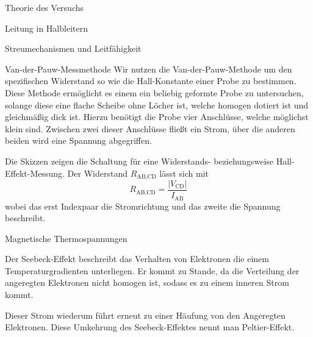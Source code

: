 \documentclass[pdftex, a4paper,11pt, twoside, ngerman]{report}
\newcommand\abs[1]{\left| #1 \right|}
\begin{document}
\begin{chapter}{Theorie des Versuchs}
\begin{section}{Leitung in Halbleitern}
\begin{subsection}{Streumechanismen und Leitfähigkeit}

         \end{subsection}

        \begin{subsection}{Van-der-Pauw-Messmethode}
            Wir nutzen die Van-der-Pauw-Methode um den spezifischen Widerstand so wie die Hall-Konstante einer Probe zu bestimmen.
            Diese Methode ermöglicht es einem ein beliebig geformte Probe zu untersuchen, solange diese eine flache Scheibe ohne Löcher ist, welche homogen dotiert ist und gleichmäßig dick ist.
            Hierzu benötigt die Probe vier Anschlüsse, welche möglichst klein sind. 
            Zwischen zwei dieser Anschlüsse fließt ein Strom, über die anderen beiden wird eine Spannung abgegriffen.

            Die Skizzen zeigen die Schaltung für eine Widerstands- beziehungsweise Hall-Effekt-Messung.
            Der Widerstand $R_\text{AB,CD}$ lässt sich mit 
            \[
                R_\text{AB,CD} = \frac{\abs{V_\text{CD}}}{I_\text{AB}}
            \]
            wobei das erst Indexpaar die Stromrichtung und das zweite die Spannung beschreibt.



        \end{subsection}

        \begin{subsection}{Magnetische Thermospannungen}

                Der Seebeck-Effekt beschreibt das Verhalten von Elektronen die einem Temperaturgradienten unterliegen. 
                Er kommt zu Stande, da die Verteilung der angeregten Elektronen nicht homogen ist, sodass es zu einem inneren Strom kommt.
                
                Dieser Strom wiederum führt erneut zu einer Häufung von den Angeregten Elektronen.
                Diese Umkehrung des Seebeck-Effektes nennt man Peltier-Effekt.


\end{subsection}
\end{section}
\end{chapter}
\end{document}
